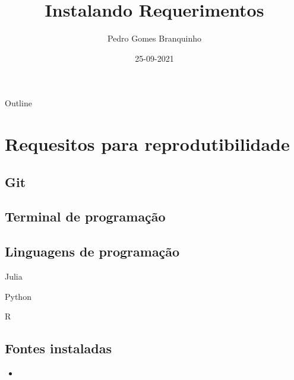 \documentclass[presentation]{beamer}
\author{Pedro Gomes Branquinho}
\date{25-09-2021}
\title{Instalando Requerimentos}
\begin{document}
\maketitle
\begin{frame}{Outline}
\tableofcontents
\end{frame}



\section{Requesitos para reprodutibilidade}
\label{sec:org68f45c6}
\subsection{Git}
\label{sec:org8fce0e2}
\subsection{Terminal de programação}
\label{sec:orga469c33}
\subsection{Linguagens de programação}
\label{sec:org50e99e5}
\begin{frame}[label={sec:org18dd9ad}]{Julia}
\end{frame}
\begin{frame}[label={sec:orge1019a0}]{Python}
\end{frame}
\begin{frame}[label={sec:orge238ba9}]{R}
\end{frame}
\subsection{Fontes instaladas}
\label{sec:orge255a26}
\begin{itemize}
\item 
\end{itemize}
\end{document}
